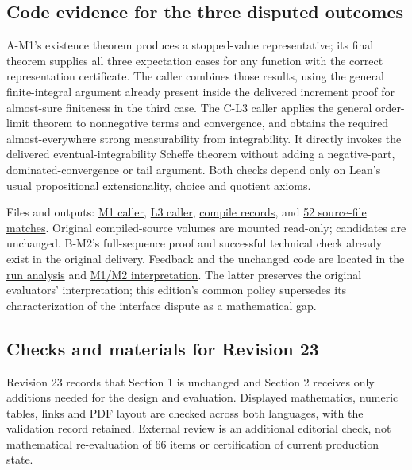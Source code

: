 \subsection[Code evidence for the three disputed outcomes]{\texorpdfstring{\protect\hypertarget{q5}{}Code evidence for the three disputed outcomes}{Code evidence for the three disputed outcomes}}
A-M1's existence theorem produces a stopped-value representative; its final theorem supplies all three expectation cases for any function with the correct representation certificate. The caller combines those results, using the general finite-integral argument already present inside the delivered increment proof for almost-sure finiteness in the third case. The C-L3 caller applies the general order-limit theorem to nonnegative terms and convergence, and obtains the required almost-everywhere strong measurability from integrability. It directly invokes the delivered eventual-integrability Scheffe theorem without adding a negative-part, dominated-convergence or tail argument. Both checks depend only on Lean's usual propositional extensionality, choice and quotient axioms.

Files and outputs: \href{verification/revision23/evaluation/M1.lean}{M1 caller}, \href{verification/revision23/evaluation/L3.lean}{L3 caller}, \href{verification/revision23/evaluation/caller_checks.json}{compile records}, and \href{verification/revision23/evaluation/compiled_source_binding.json}{52 source-file matches}. Original compiled-source volumes are mounted read-only; candidates are unchanged. B-M2's full-sequence proof and successful technical check already exist in the original delivery. Feedback and the unchanged code are located in the \href{verification/revision23/analysis/RUN_DETAILS.zh-CN.md}{run analysis} and \href{verification/revision23/analysis/M1A_M2B_INTERPRETATION.zh-CN.md}{M1/M2 interpretation}. The latter preserves the original evaluators' interpretation; this edition's common policy supersedes its characterization of the interface dispute as a mathematical gap.

\subsection[Checks and materials for Revision 23]{\texorpdfstring{\protect\hypertarget{q6}{}Checks and materials for Revision 23}{Checks and materials for Revision 23}}
Revision 23 records that Section 1 is unchanged and Section 2 receives only additions needed for the design and evaluation. Displayed mathematics, numeric tables, links and PDF layout are checked across both languages, with the validation record retained. External review is an additional editorial check, not mathematical re-evaluation of 66 items or certification of current production state.

